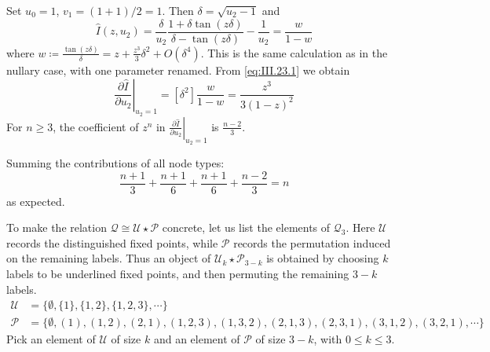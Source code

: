 Set $u_{0} = 1$, $v_{1} = (1 + 1)/2 = 1$. Then $\delta = \sqrt{u_{2} - 1}$ and
\begin{equation*}
    \hat{I}(z, u_{2}) = \frac{\delta}{u_{2}} \frac{1 + \delta\tan(z\delta)}{\delta - \tan(z\delta)} - \frac{1}{u_{2}} = \frac{w}{1 - w}
\end{equation*}
where $w \coloneqq \frac{\tan(z\delta)}{\delta} = z + \frac{z^{3}}{3}\delta^{2} + O(\delta^{4})$.
This is the same calculation as in the nullary case, with one parameter renamed. From \eqref{eq:III.23.1} we obtain
\begin{equation*}
    \left.\frac{\partial \hat{I}}{\partial u_{2}}\right|_{u_{2} = 1}
    = [\delta^{2}] \frac{w}{1 - w}
    = \frac{z^{3}}{3(1 - z)^{2}}
\end{equation*}
For $n \geq 3$, the coefficient of $z^{n}$ in
$\left.\frac{\partial \hat{I}}{\partial u_{2}}\right|_{u_{2} = 1}$ is $\frac{n - 2}{3}$.

Summing the contributions of all node types:
\begin{equation*}
    \frac{n + 1}{3} + \frac{n + 1}{6} + \frac{n + 1}{6} + \frac{n - 2}{3} = n
\end{equation*}
as expected.


To make the relation $\mathcal{Q} \cong \mathcal{U} \star \mathcal{P}$ concrete, let us list the elements of $\mathcal{Q}_{3}$.
Here $\mathcal{U}$ records the distinguished fixed points, while $\mathcal{P}$ records the
permutation induced on the remaining labels. Thus an object of
$\mathcal{U}_k\star\mathcal{P}_{3-k}$ is obtained by choosing $k$ labels to be underlined fixed
points, and then permuting the remaining $3-k$ labels.
\begin{equation*}
    \begin{aligned}
        \mathcal{U} &= \{ \emptyset, \{1\}, \{1, 2\}, \{1, 2, 3\}, \cdots \} \\
        \mathcal{P} &= \{ \emptyset, (1), (1,2), (2,1), (1,2,3), (1,3,2), (2,1,3), (2,3,1), (3,1,2), (3,2,1), \cdots \}
    \end{aligned}
\end{equation*}
Pick an element of $\mathcal{U}$ of size $k$ and an element of $\mathcal{P}$ of size $3 - k$, with $0 \leq k \leq 3$.

